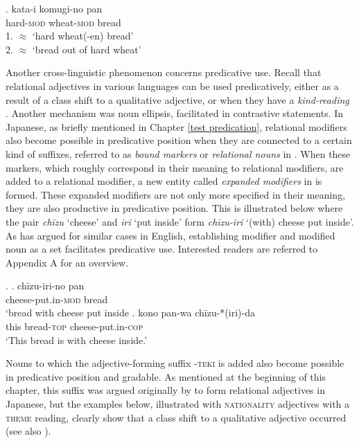 \documentclass [output=book,colorlinks,citecolor=brown]{langscibook}
\begin{document}
\exg. kata-i komugi-no pan\\
hard-\textsc{mod} wheat-\textsc{mod} bread\\
1. $\approx$ `hard wheat(-en) bread’\\
2. $\approx$ `bread out of hard wheat' \label{katai komugi}

Another cross-linguistic phenomenon concerns predicative use. Recall that relational adjectives in various languages can be used predicatively, either as a result of a class shift to a qualitative adjective, or when they have a \textit{kind-reading} \citep{mcnally:2004:relational}. Another mechanism was noun ellipsis, facilitated in contrastive statements. In Japanese, as briefly mentioned in Chapter \ref{test predication}, relational modifiers also become possible in predicative position when they are connected to a certain kind of suffixes, referred to as \textit{bound markers} or \textit{relational nouns} in \citet{nagano:2016:are, shimada:2018:relational}. When these markers, which roughly correspond in their meaning to relational modifiers, are added to a relational modifier, a new entity called \textit{expanded modifiers} in \citet[54]{nagano:2016:are} is formed. These expanded modifiers are not only more specified in their meaning, they are also productive in predicative position. This is illustrated below where the pair \textit{chīzu} `cheese’ and \textit{iri} `put inside’ form \textit{chīzu-iri} `(with) cheese put inside’. As \citet{levi:1978:syntax} has argued for similar cases in English, establishing modifier and modified noun as a set facilitates predicative use. Interested readers are referred to Appendix A for an overview. %

\ex. \ag. chīzu-iri-no pan\\
cheese-put.in-\textsc{mod} bread\\
`bread with cheese put inside
\bg. kono pan-wa chīzu-*(iri)-da\\
this bread-\textsc{top} cheese-put.in-\textsc{cop} \\
`This bread is with cheese inside.’

Nouns to which the adjective-forming suffix -\textsc{teki} is added also become possible in predicative position and gradable. As mentioned at the beginning of this chapter, this suffix was argued originally by \citet{bisetto:2010:RA} to form relational adjectives in Japanese, but the examples below, illustrated with \textsc{nationality} adjectives with a \textsc{theme} reading, clearly show that a class shift to a qualitative adjective occurred (see also \citealt[48]{nagano:2016:are}).
\end{document}

